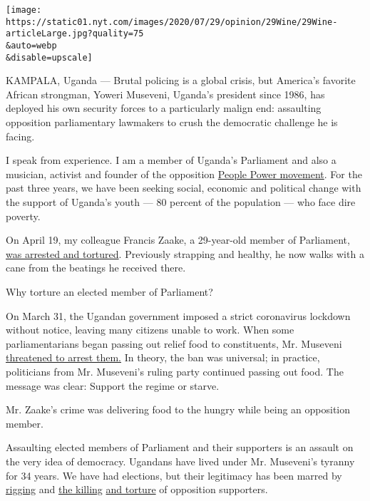 \texttt{[image: https://static01.nyt.com/images/2020/07/29/opinion/29Wine/29Wine-articleLarge.jpg?quality=75\\\&auto=webp\\\&disable=upscale]}

KAMPALA, Uganda --- Brutal policing is a global crisis, but America's
favorite African strongman, Yoweri Museveni, Uganda's president since
1986, has deployed his own security forces to a particularly malign end:
assaulting opposition parliamentary lawmakers to crush the democratic
challenge he is facing.

I speak from experience. I am a member of Uganda's Parliament and also a
musician, activist and founder of the opposition
\href{https://www.thenation.com/article/archive/can-bobi-wine-unite-uganda-and-bring-down-a-dictator/}{People
Power movement}. For the past three years, we have been seeking social,
economic and political change with the support of Uganda's youth --- 80
percent of the population --- who face dire poverty.

On April 19, my colleague Francis Zaake, a 29-year-old member of
Parliament,
\href{https://www.buzzfeednews.com/article/lesterfeder/uganda-francis-zaake-coronavirus}{was
arrested and tortured}. Previously strapping and healthy, he now walks
with a cane from the beatings he received there.

Why torture an elected member of Parliament?

On March 31, the Ugandan government imposed a strict coronavirus
lockdown without notice, leaving many citizens unable to work. When some
parliamentarians began passing out relief food to constituents, Mr.
Museveni
\href{https://www.softpower.ug/covid-19-mps-nsereko-luttamaguzi-risk-being-arrested-for-distributing-food/}{threatened
to arrest them.} In theory, the ban was universal; in practice,
politicians from Mr. Museveni's ruling party continued passing out food.
The message was clear: Support the regime or starve.

Mr. Zaake's crime was delivering food to the hungry while being an
opposition member.

Assaulting elected members of Parliament and their supporters is an
assault on the very idea of democracy. Ugandans have lived under Mr.
Museveni's tyranny for 34 years. We have had elections, but their
legitimacy has been marred by
\href{https://www.nybooks.com/daily/2016/05/16/uganda-cost-of-fake-democracy/}{rigging}
and
\href{https://www.hrw.org/news/2005/12/19/uganda-respect-opposition-right-campaign}{the
killing}
\href{https://www.theguardian.com/world/2006/feb/26/uganda.deniscampbell}{and
torture} of opposition supporters.

